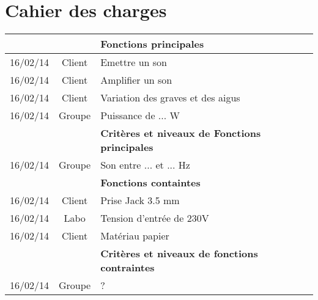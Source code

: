 

\section{Cahier des charges}

\begin{table*} [h]
	
		\begin{tabular}{|l|c|l|}
		\hline
			 & & \textbf{Fonctions principales} \\
		\hline
			16/02/14 & Client & Emettre un son \\
			16/02/14 & Client & Amplifier un son \\
			16/02/14 & Client & Variation des graves et des aigus \\
			16/02/14 & Groupe & Puissance de ... W \\
		\hline
			 & & \textbf{Critères et niveaux de Fonctions principales} \\
		\hline
			16/02/14 & Groupe & Son entre ... et ... Hz \\
		\hline
			 & & \textbf{Fonctions containtes} \\
		\hline
			16/02/14 & Client & Prise Jack 3.5 mm \\
			16/02/14 & Labo & Tension d'entrée de 230V \\
			16/02/14 & Client & Matériau papier \\
		\hline
			 & & \textbf{Critères et niveaux de fonctions contraintes} \\
		\hline
			16/02/14 & Groupe & ? \\
		\hline
		\end{tabular}
		
\end{table*}

